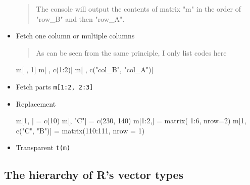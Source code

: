 \documentclass[
]{article}
\newenvironment{Shaded}{}{}
\newcommand{\AttributeTok}[1]{\textcolor[rgb]{0.49,0.56,0.16}{#1}}
\newcommand{\DecValTok}[1]{\textcolor[rgb]{0.25,0.63,0.44}{#1}}
\newcommand{\FunctionTok}[1]{\textcolor[rgb]{0.02,0.16,0.49}{#1}}
\newcommand{\NormalTok}[1]{#1}
\newcommand{\OtherTok}[1]{\textcolor[rgb]{0.00,0.44,0.13}{#1}}
\newcommand{\SpecialCharTok}[1]{\textcolor[rgb]{0.25,0.44,0.63}{#1}}
\newcommand{\StringTok}[1]{\textcolor[rgb]{0.25,0.44,0.63}{#1}}
\begin{document}
\begin{itemize}
\begin{quote}
  The console will output the contents of matrix "m" in the order of
  "row\_B" and then "row\_A".
  \end{quote}
\item
  Fetch one column or multiple columns

  \begin{quote}
  As can be seen from the same principle, I only list codes here
  \end{quote}

\begin{Shaded}
\begin{Highlighting}[]
\NormalTok{m[ , }\DecValTok{1}\NormalTok{]}
\NormalTok{m[ , }\FunctionTok{c}\NormalTok{(}\DecValTok{1}\SpecialCharTok{:}\DecValTok{2}\NormalTok{)]}
\NormalTok{m[ , }\FunctionTok{c}\NormalTok{(}\StringTok{"col\_B"}\NormalTok{, }\StringTok{"col\_A"}\NormalTok{)]}
\end{Highlighting}
\end{Shaded}
\item
  Fetch parts \texttt{m{[}1:2,\ 2:3{]}}
\item
  Replacement

\begin{Shaded}
\begin{Highlighting}[]
\NormalTok{m[}\DecValTok{1}\NormalTok{, ] }\OtherTok{=} \FunctionTok{c}\NormalTok{(}\DecValTok{10}\NormalTok{)}
\NormalTok{m[, }\StringTok{"C"}\NormalTok{] }\OtherTok{=} \FunctionTok{c}\NormalTok{(}\DecValTok{230}\NormalTok{, }\DecValTok{140}\NormalTok{)}
\NormalTok{m[}\DecValTok{1}\SpecialCharTok{:}\DecValTok{2}\NormalTok{,] }\OtherTok{=} \FunctionTok{matrix}\NormalTok{( }\DecValTok{1}\SpecialCharTok{:}\DecValTok{6}\NormalTok{, }\AttributeTok{nrow=}\DecValTok{2}\NormalTok{)}
\NormalTok{m[}\DecValTok{1}\NormalTok{, }\FunctionTok{c}\NormalTok{(}\StringTok{"C"}\NormalTok{, }\StringTok{"B"}\NormalTok{)] }\OtherTok{=} \FunctionTok{matrix}\NormalTok{(}\DecValTok{110}\SpecialCharTok{:}\DecValTok{111}\NormalTok{, }\AttributeTok{nrow =} \DecValTok{1}\NormalTok{)}
\end{Highlighting}
\end{Shaded}
\item
  Transparent \texttt{t(m)}
\end{itemize}

\hypertarget{the-hierarchy-of-rs-vector-types}{%
\subsection{The hierarchy of R's vector
types}\label{the-hierarchy-of-rs-vector-types}}
\end{document}
